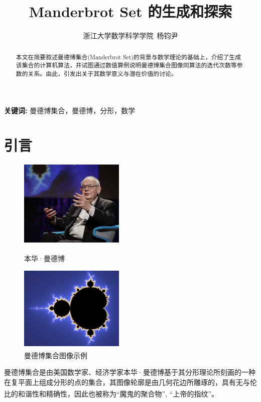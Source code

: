 \documentclass{ctexart}
\title{Manderbrot Set 的生成和探索}
\author{浙江大学数学科学学院\ 杨钧尹}
\date{}
\begin{document}
\maketitle

\begin{abstract}
本文在简要叙述曼德博集合(Manderbrot Set)的背景与数学理论的基础上，介绍了生成该集合的计算机算法，并试图通过数值算例说明曼德博集合图像同算法的迭代次数等参数的关系。由此，引发出关于其数学意义与潜在价值的讨论。
\end{abstract}
\par 
{\bf 关键词:} 曼德博集合，曼德博，分形，数学

\section{引言}

\begin{figure}[htbp]
\centering
\begin{minipage}{0.5\textwidth}
\centering
\includegraphics[width=5cm]{./sources/images/mandelbort.png}
\caption{本华·曼德博\textsuperscript{\cite{mandelbort_wiki}}}
\end{minipage}\hfill
\begin{minipage}{0.5\textwidth}
\centering
\includegraphics[width=5cm]{./sources/images/set.png}
\caption{曼德博集合图像示例\textsuperscript{\cite{set_pic}}}
\end{minipage}
\end{figure}

曼德博集合是由美国数学家、经济学家本华·曼德博基于其分形理论所刻画的一种在复平面上组成分形的点的集合，其图像轮廓是由几何花边所雕琢的，具有无与伦比的和谐性和精确性，因此也被称为“魔鬼的聚合物”, “上帝的指纹”。\textsuperscript{\cite{mandelbort_wiki}}
\end{document}
